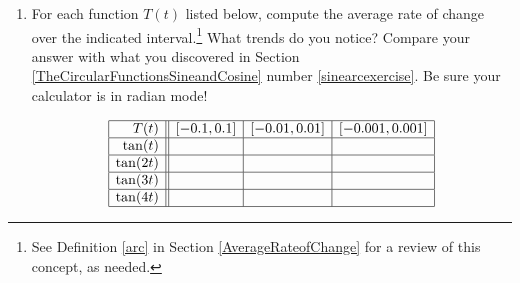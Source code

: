 \documentclass{ximera}
\begin{document}
\begin{enumerate}
\setcounter{enumi}{\value{HW}}

\item \label{tangentarcexercise}For each function $T(t)$ listed below, compute the average rate of change over the indicated interval.\footnote{See Definition \ref{arc} in Section \ref{AverageRateofChange} for a review of this concept, as needed.}  What trends do you notice? Compare your answer with what you discovered in Section \ref{TheCircularFunctionsSineandCosine} number \ref{sinearcexercise}.  Be sure your calculator is in radian mode!

\[ \begin{array}{|r||c|c|c|}  \hline

 T(t) &  [-0.1, 0.1] & [-0.01, 0.01] &[-0.001, 0.001] \\ \hline
 \tan(t)     &&&  \\  \hline
 \tan(2t)   &&&  \\ \hline
 \tan(3t)   &&&   \\  \hline
 \tan(4t)   &&&   \\  \hline

\end{array} \]

\setcounter{HW}{\value{enumi}}
\end{enumerate}
\end{document}
